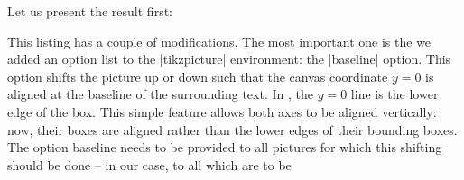 Let us present the result first:
%
\begin{codeexample}[]
%
%
\hskip 10pt %
%
\end{codeexample}
%
This listing has a couple of modifications. The most important one is the we
added an option list to the |tikzpicture| environment: the |baseline| option.
This option shifts the picture up or down such that the canvas coordinate $y=0$
is aligned at the baseline of the surrounding text. In \PGFPlots{}, the $y=0$
line is the lower edge of the box. This simple feature allows both axes to be
aligned vertically: now, their boxes are aligned rather than the lower edges of
their bounding boxes. The option baseline needs to be provided to all pictures
for which this shifting should be done -- in our case, to all which are to be
